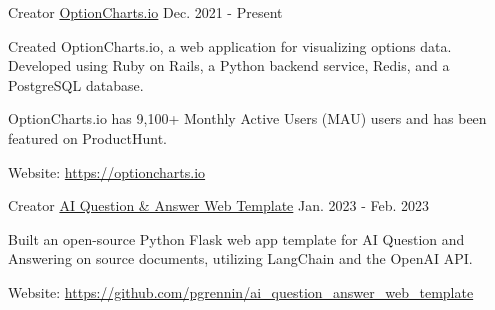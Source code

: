 

\begin{cventries}

    \cventry
    {Creator} %
    {\href{https://optioncharts.io}{OptionCharts.io}}  %
    {} %
    {Dec. 2021 - Present} %
    {
        \begin{cvitems} %
            \item {Created OptionCharts.io, a web application for visualizing options data. Developed using Ruby on Rails, a Python backend service, Redis, and a PostgreSQL database.}
            \item {OptionCharts.io has 9,100+ Monthly Active Users (MAU) users and has been featured on ProductHunt.}
            \item {Website: \href{https://optioncharts.io}{https://optioncharts.io}}
        \end{cvitems}
    }

    \cventry
    {Creator} %
    {\href{https://github.com/pgrennin/ai_question_answer_web_template}{AI Question \& Answer Web Template}}  %
    {} %
    {Jan. 2023 - Feb. 2023} %
    {
        \begin{cvitems} %
            \item {Built an open-source Python Flask web app template for AI Question and Answering on source documents, utilizing LangChain and the OpenAI API.}
            \item {Website: \href{https://github.com/pgrennin/ai_question_answer_web_template}{https://github.com/pgrennin/ai\_question\_answer\_web\_template}}
        \end{cvitems}
    }
\end{cventries}
